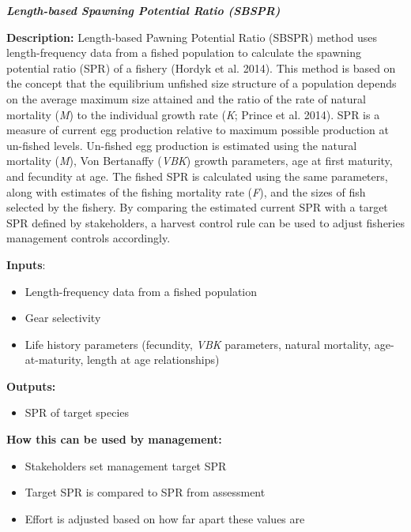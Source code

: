 \documentclass[]{book}
\providecommand{\tightlist}{%
  \setlength{\itemsep}{0pt}\setlength{\parskip}{0pt}}
\begin{document}
\textbf{\emph{Length-based Spawning Potential Ratio (SBSPR)}}

\textbf{Description:} Length-based Pawning Potential Ratio (SBSPR)
method uses length-frequency data from a fished population to calculate
the spawning potential ratio (SPR) of a fishery (Hordyk et al. 2014).
This method is based on the concept that the equilibrium unfished size
structure of a population depends on the average maximum size attained
and the ratio of the rate of natural mortality (\emph{M}) to the
individual growth rate (\emph{K}; Prince et al. 2014). SPR is a measure
of current egg production relative to maximum possible production at
un-fished levels. Un-fished egg production is estimated using the
natural mortality (\emph{M}), Von Bertanaffy (\emph{VBK}) growth
parameters, age at first maturity, and fecundity at age. The fished SPR
is calculated using the same parameters, along with estimates of the
fishing mortality rate (\emph{F}), and the sizes of fish selected by the
fishery. By comparing the estimated current SPR with a target SPR
defined by stakeholders, a harvest control rule can be used to adjust
fisheries management controls accordingly.

\textbf{Inputs}:

\begin{itemize}
\tightlist
\item
  Length-frequency data from a fished population
\end{itemize}

\begin{itemize}
\item
  Gear selectivity
\item
  Life history parameters (fecundity, \emph{VBK} parameters, natural
  mortality, age-at-maturity, length at age relationships)
\end{itemize}

\textbf{Outputs:}

\begin{itemize}
\tightlist
\item
  SPR of target species
\end{itemize}

\textbf{How this can be used by management: }

\begin{itemize}
\item
  Stakeholders set management target SPR
\item
  Target SPR is compared to SPR from assessment
\item
  Effort is adjusted based on how far apart these values are
\end{itemize}
\end{document}

